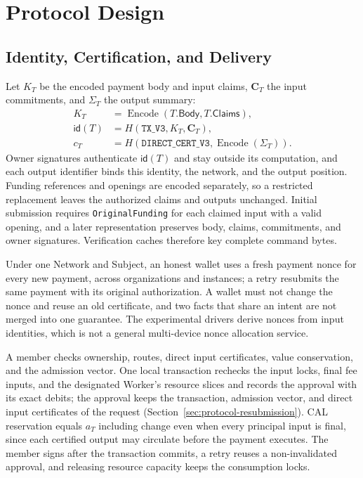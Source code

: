 
\section{Protocol Design}
\label{sec:protocol}

\subsection{Identity, Certification, and Delivery}
\label{sec:protocol-certification}

Let $K_T$ be the encoded payment body and input claims, $\mathbf{C}_T$ the input commitments, and $\Sigma_T$ the output summary:
\begin{equation}
  \begin{aligned}
    K_T &= \operatorname{Encode}(T.\mathsf{Body},T.\mathsf{Claims}),\\
    \mathsf{id}(T) &= H(\texttt{TX\_V3},K_T,\mathbf{C}_T),\\
    c_T &= H(\texttt{DIRECT\_CERT\_V3},\operatorname{Encode}(\Sigma_T)).
  \end{aligned}
  \label{eq:protocol-identities}
\end{equation}
Owner signatures authenticate $\mathsf{id}(T)$ and stay outside its computation, and each output identifier binds this identity, the network, and the output position. Funding references and openings are encoded separately, so a restricted replacement leaves the authorized claims and outputs unchanged. Initial submission requires \texttt{OriginalFunding} for each claimed input with a valid opening, and a later representation preserves body, claims, commitments, and owner signatures. Verification caches therefore key complete command bytes.

Under one Network and Subject, an honest wallet uses a fresh payment nonce for every new payment, across organizations and instances; a retry resubmits the same payment with its original authorization. A wallet must not change the nonce and reuse an old certificate, and two facts that share an intent are not merged into one guarantee. The experimental drivers derive nonces from input identities, which is not a general multi-device nonce allocation service.

A member checks ownership, routes, direct input certificates, value conservation, and the admission vector. One local transaction rechecks the input locks, final fee inputs, and the designated Worker's resource slices and records the approval with its exact debits; the approval keeps the transaction, admission vector, and direct input certificates of the request (Section~\ref{sec:protocol-resubmission}). CAL reservation equals $a_T$ including change even when every principal input is final, since each certified output may circulate before the payment executes. The member signs after the transaction commits, a retry reuses a non-invalidated approval, and releasing resource capacity keeps the consumption locks.

